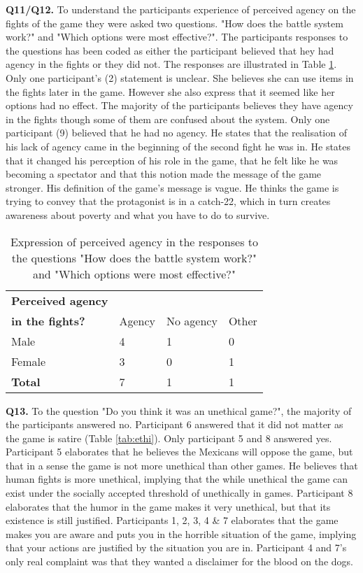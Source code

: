 \textbf{Q11/Q12.} To understand the participants experience of perceived agency on the fights of the game they were asked two questions. "How does the battle system work?" and "Which options were most effective?". The participants responses to the questions has been coded as either the participant believed that hey had agency in the fights or they did not. The responses are illustrated in Table \ref{tab:agen}. Only one participant's (2) statement is unclear. She believes she can use items in the fights later in the game. However she also express that it seemed like her options had no effect. The majority of the participants believes they have agency in the fights though some of them are confused about the system. Only one participant (9) believed that he had no agency. He states that the realisation of his lack of agency came in the beginning of the second fight he was in. He states that it changed his perception of his role in the game, that he felt like he was becoming a spectator and that this notion made the message of the game stronger. His definition of the game's message is vague. He thinks the game is trying to convey that the protagonist is in a catch-22, which in turn creates awareness about poverty and what you have to do  to survive.

\begin{table}[h]
\centering
\begin{tabular}{l l l l}
\hline
\textbf{Perceived agency}\\
\textbf{in the fights?} & Agency & No agency & Other \\
\hline
Male & 4 & 1 & 0 \\
Female & 3 & 0 & 1 \\
\textbf{Total} & 7 & 1 & 1 \\
\hline
\end{tabular}
\caption{\label{tab:agen}Expression of perceived agency in the responses to the questions "How does the battle system work?" and "Which options were most effective?"}
\end{table}


\textbf{Q13.} To the question "Do you think it was an unethical game?", the majority of the participants answered no. Participant 6 answered that it did not matter as the game is satire (Table \ref{tab:ethi}). Only participant 5 and 8 answered yes. Participant 5 elaborates that he believes the Mexicans will oppose the game, but that in a sense the game is not more unethical than other games. He believes that human fights is more unethical, implying that the while unethical the game can exist under the socially accepted threshold of unethically in games. Participant 8 elaborates that the humor in the game makes it very unethical, but that its existence is still justified. Participants 1, 2, 3, 4 & 7 elaborates that the game makes you are aware and puts you in the horrible situation of the game, implying that your actions are justified by the situation you are in. Participant 4 and 7's only real complaint was that they wanted a disclaimer for the blood on the dogs.

